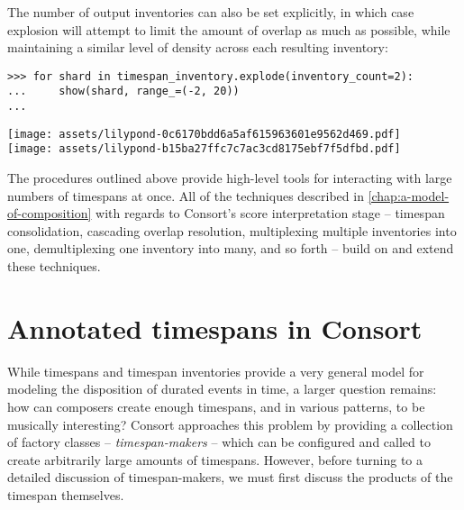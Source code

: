 \noindent The number of output inventories can also be set explicitly, in which
case explosion will attempt to limit the amount of overlap as much as possible,
while maintaining a similar level of density across each resulting inventory:

\begin{comment}
<abjad>
for shard in timespan_inventory.explode(inventory_count=2):
    show(shard, range_=(-2, 20))

</abjad>
\end{comment}

\begin{abjadbookoutput}
\begin{singlespacing}
\vspace{-0.5\baselineskip}
\begin{verbatim}
>>> for shard in timespan_inventory.explode(inventory_count=2):
...     show(shard, range_=(-2, 20))
...
\end{verbatim}
\noindent\texttt{[image: assets/lilypond-0c6170bdd6a5af615963601e9562d469.pdf]}\\
\noindent\texttt{[image: assets/lilypond-b15ba27ffc7c7ac3cd8175ebf7f5dfbd.pdf]}
\end{singlespacing}
\end{abjadbookoutput}

The procedures outlined above provide high-level tools for interacting with
large numbers of timespans at once. All of the techniques described in
\autoref{chap:a-model-of-composition} with regards to Consort's score
interpretation stage -- timespan consolidation, cascading overlap
resolution, multiplexing multiple inventories into one, demultiplexing one
inventory into many, and so forth -- build on and extend these techniques.

\section{Annotated timespans in Consort}
\label{sec:annotated-timespans-in-consort}

While timespans and timespan inventories provide a very general model for
modeling the disposition of durated events in time, a larger question remains:
how can composers create enough timespans, and in various patterns, to be
musically interesting? Consort approaches this problem by providing a
collection of factory classes -- \emph{timespan-makers} -- which can be
configured and called to create arbitrarily large amounts of timespans.
However, before turning to a detailed discussion of timespan-makers, we must
first discuss the products of the timespan themselves.


